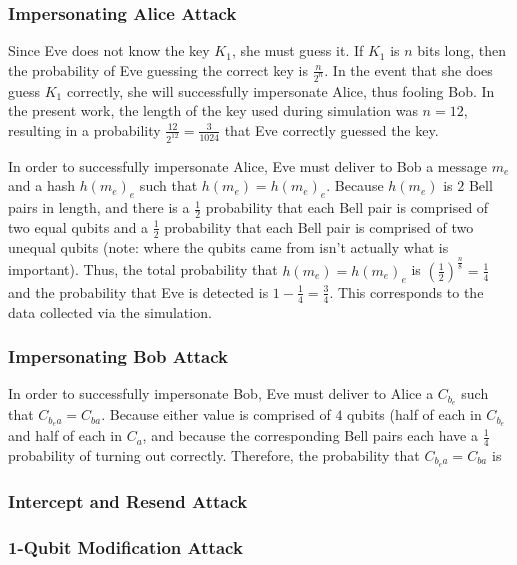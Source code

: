 \documentclass[conference]{IEEEtran}
\begin{document}
\subsubsection{Impersonating Alice Attack}

Since Eve does not know the key $K_{1}$, she must guess it. If $K_{1}$
is $n$ bits long, then the probability of Eve guessing the correct
key is $\frac{n}{2^{n}}$. In the event that she does guess $K_{1}$
correctly, she will successfully impersonate Alice, thus fooling Bob.
In the present work, the length of the key used during simulation
was $n=12$, resulting in a probability $\frac{12}{2^{12}}=\frac{3}{1024}$
that Eve correctly guessed the key. 

In order to successfully impersonate Alice, Eve must deliver to Bob
a message $m_{e}$ and a hash $h\left(m_{e}\right)_{e}$ such that
$h\left(m_{e}\right)=h\left(m_{e}\right)_{e}$. Because $h\left(m_{e}\right)$
is $2$ Bell pairs in length, and there is a $\frac{1}{2}$ probability
that each Bell pair is comprised of two equal qubits and a $\frac{1}{2}$
probability that each Bell pair is comprised of two unequal qubits
(note: where the qubits came from isn't actually what is important).
Thus, the total probability that $h\left(m_{e}\right)=h\left(m_{e}\right)_{e}$
is $\left(\frac{1}{2}\right)^{\frac{n}{8}}=\frac{1}{4}$ and the probability
that Eve is detected is $1-\frac{1}{4}=\frac{3}{4}$. This corresponds
to the data collected via the simulation.

\subsubsection{Impersonating Bob Attack}

In order to successfully impersonate Bob, Eve must deliver to Alice
a $C_{b_{e}}$ such that $C_{b_{e}a}=C_{ba}$. Because either value
is comprised of $4$ qubits (half of each in $C_{b_{e}}$ and half
of each in $C_{a}$, and because the corresponding Bell pairs each
have a $\frac{1}{4}$ probability of turning out correctly. Therefore,
the probability that $C_{b_{e}a}=C_{ba}$ is $ $

\subsubsection{Intercept and Resend Attack}

\subsubsection{1-Qubit Modification Attack}
\end{document}
